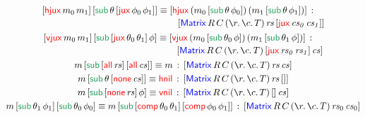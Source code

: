 \documentclass[12pt, a4paper]{article}
\newcommand{\bsl}{\texttt{\symbol{92}}}
\newcommand{\Nil}{\mathbf{[]}}
\newcommand{\at}{\mathsf{at}}
\newcommand{\sub}{\mathsf{sub}}
\newcommand{\atElim}[3]{{#1} \gp \elim{\at}{{#2} \gp {#3}}}
\newcommand{\gp}{\,}
\newcommand{\forms}[3]{
  \ifthenelse{\equal{{#2}}{}}
  {\textcolor{#3}{\gp {#1}}}
  {[\textcolor{#3}{#1}\gp {#2}]}
}
\newcommand{\elim}[2]{\forms{#1}{#2}{ForestGreen}}
\newcommand{\subst}[2]{{#1}\lfloor {#2} \rfloor}
\newcommand{\substfor}[3]{\subst{#1}{ {#2} / {#3} }}
\newcommand{\C}[1]{\textcolor{red}{\mathsf{#1}}}
\newcommand{\D}[1]{\textcolor{blue}{\mathsf{#1}}}
\newcommand{\one}[1]{[ \C{one} \gp  {#1} ]}
\newcommand{\Matrix}[7]{[ \D{Matrix} \gp {#1} \gp {#2} \gp ( \la{#3}\la{#4} {#5}) \gp {#6} \gp {#7}]}
\newcommand{\Elem}[2]{[ \D{Elem} \gp {#1} \gp {#2} ]}
\newcommand{\MRCT}[2]{\Matrix{R}{C}{r}{c}{T}{#1}{#2}}
\newcommand{\vnil}{\single{\C{vnil}}}
\newcommand{\hnil}{\single{\C{hnil}}}
\newcommand{\jux}[2]{[ \C{jux} \gp {#1} \gp {#2}]}
\newcommand{\hjux}[2]{[ \C{hjux} \gp {#1} \gp {#2}]}
\newcommand{\vjux}[2]{[ \C{vjux} \gp {#1} \gp {#2}]}
\newcommand{\oneElem}[1]{[\C{one} \gp  {#1} ]}
\newcommand{\leftElem}[2]{[ \C{left} \gp {#1} \gp {#2}]}
\newcommand{\rightElem}[2]{[ \C{right} \gp {#1} \gp {#2}]}
\newcommand{\thAll}[1]{[ \C{all} \gp {#1}]}
\newcommand{\thNone}[1]{[ \C{none} \gp {#1}]}
\newcommand{\thComp}[2]{[ \C{comp} \gp {#1} \gp {#2}]}
\newcommand{\thJux}[2]{[ \C{jux} \gp {#1} \gp {#2}]}
\newcommand{\subElim}[3]{{#1} \gp \elim{\sub}{{#2} \gp {#3}}}
\newcommand{\eqJ}[3]{{#1} \equiv {#2} \hab {#3}}
\newcommand{\eqJlong}[3]{
 \begin{multlined}
   {#1} \equiv {#2} \hab \\ {#3}
 \end{multlined} }
\newcommand{\hab}{\gp : \gp}
\newcommand{\la}[1]{\bsl{#1}.\,}
\newcommand{\V}[1]{\mathit{#1}}
\newcommand{\single}[1]{#1}
\begin{document}
\begin{gather*}
  \eqJlong
    {\subElim{\hjux{m_{0}}{m_{1}}}{\theta}{\thJux{\phi_{0}}{\phi_{1}}}}
    {\hjux{(\subElim{m_{0}}{\theta}{\phi_{0}})}{(\subElim{m_{1}}{\theta}{\phi_{1}})}}
    {\MRCT{\V{rs}}{\jux{\V{cs_{0}}}{\V{cs_{1}}}}}\\
  \eqJlong
    {\subElim{\vjux{m_{0}}{m_{1}}}{\thJux{\theta_{0}}{\theta_{1}}}{\phi}}
    {\vjux{(\subElim{m_{0}}{\theta_{0}}{\phi})}{(\subElim{m_{1}}{\theta_{1}}{\phi})}}
    {\MRCT{\jux{\V{rs_{0}}}{\V{rs_{1}}}}{\V{cs}}}\\
  \eqJ
    {\subElim{m}{\thAll{\V{rs}}}{\thAll{\V{cs}}}}
    {m}
    {\MRCT{\V{rs}}{\V{cs}}}\\
  \eqJ
    {\subElim{m}{\theta}{\thNone{\V{cs}}}}
    {\hnil}
    {\MRCT{\V{rs}}{\Nil}}\\
  \eqJ
    {\subElim{m}{\thNone{\V{rs}}}{\phi}}
    {\vnil}
    {\MRCT{\Nil}{\V{cs}}}\\
  \eqJ
    {\subElim{\subElim{m}{\theta_{1}}{\phi_{1}}}{\theta_{0}}{\phi_{0}}}
    {\subElim{m}{\thComp{\theta_{0}}{\theta_{1}}}{\thComp{\phi_{0}}{\phi_{1}}}}
    {\MRCT{\V{rs}_{0}}{\V{cs}_{0}}}\\
\end{gather*}

\end{document}
